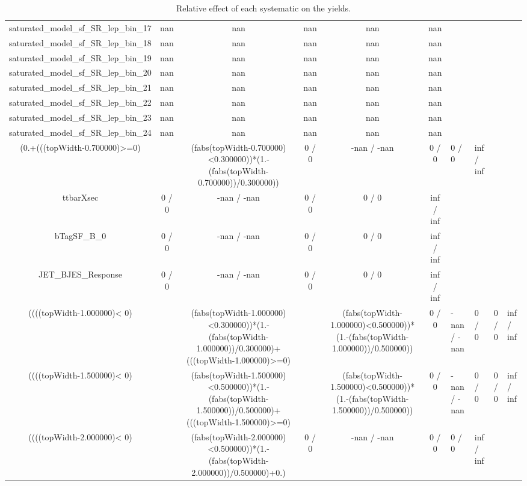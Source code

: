 \documentclass[10pt]{article}
\begin{document}
\begin{table}[htbp]
\begin{center}
\begin{tabular}{|c|c|c|c|c|c|}
 saturated_model_sf_SR_lep_bin_17 &    nan    &    nan    &    nan    &    nan    &    nan    \\ 
 saturated_model_sf_SR_lep_bin_18 &    nan    &    nan    &    nan    &    nan    &    nan    \\ 
 saturated_model_sf_SR_lep_bin_19 &    nan    &    nan    &    nan    &    nan    &    nan    \\ 
 saturated_model_sf_SR_lep_bin_20 &    nan    &    nan    &    nan    &    nan    &    nan    \\ 
 saturated_model_sf_SR_lep_bin_21 &    nan    &    nan    &    nan    &    nan    &    nan    \\ 
 saturated_model_sf_SR_lep_bin_22 &    nan    &    nan    &    nan    &    nan    &    nan    \\ 
 saturated_model_sf_SR_lep_bin_23 &    nan    &    nan    &    nan    &    nan    &    nan    \\ 
 saturated_model_sf_SR_lep_bin_24 &    nan    &    nan    &    nan    &    nan    &    nan    \\ 
  (0.+(((topWidth-0.700000)>=0)&&(fabs(topWidth-0.700000)<0.300000))*(1.-(fabs(topWidth-0.700000))/0.300000)) & 0 / 0 & -nan / -nan & 0 / 0 & 0 / 0 & inf / inf \\ 
  ttbarXsec & 0 / 0 & -nan / -nan & 0 / 0 & 0 / 0 & inf / inf \\ 
  bTagSF_B_0 & 0 / 0 & -nan / -nan & 0 / 0 & 0 / 0 & inf / inf \\ 
  JET_BJES_Response & 0 / 0 & -nan / -nan & 0 / 0 & 0 / 0 & inf / inf \\ 
  ((((topWidth-1.000000)< 0)&&(fabs(topWidth-1.000000)<0.300000))*(1.-(fabs(topWidth-1.000000))/0.300000)+(((topWidth-1.000000)>=0)&&(fabs(topWidth-1.000000)<0.500000))*(1.-(fabs(topWidth-1.000000))/0.500000)) & 0 / 0 & -nan / -nan & 0 / 0 & 0 / 0 & inf / inf \\ 
  ((((topWidth-1.500000)< 0)&&(fabs(topWidth-1.500000)<0.500000))*(1.-(fabs(topWidth-1.500000))/0.500000)+(((topWidth-1.500000)>=0)&&(fabs(topWidth-1.500000)<0.500000))*(1.-(fabs(topWidth-1.500000))/0.500000)) & 0 / 0 & -nan / -nan & 0 / 0 & 0 / 0 & inf / inf \\ 
  ((((topWidth-2.000000)< 0)&&(fabs(topWidth-2.000000)<0.500000))*(1.-(fabs(topWidth-2.000000))/0.500000)+0.) & 0 / 0 & -nan / -nan & 0 / 0 & 0 / 0 & inf / inf \\ 
\hline 
\end{tabular} 
\caption{Relative effect of each systematic on the yields.} 
\end{center} 
\end{table} 
\end{document}
